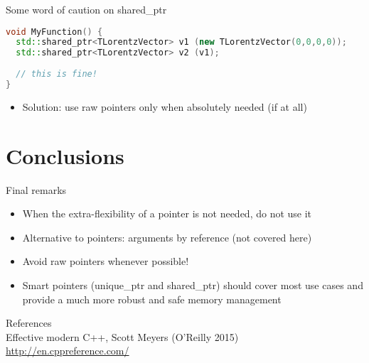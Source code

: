 \documentclass[xcolor={usenames,dvipsnames}]{beamer}
\begin{document}
\begin{frame}[fragile]{Some word of caution on shared\_ptr}
\scriptsize
\begin{lstlisting}[language=C++]
void MyFunction() {
  std::shared_ptr<TLorentzVector> v1 (new TLorentzVector(0,0,0,0));
  std::shared_ptr<TLorentzVector> v2 (v1);
  
  // this is fine!
}
\end{lstlisting}
\small
\begin{itemize}
\item Solution: use raw pointers only when absolutely needed (if at all)
\end{itemize}
\end{frame}

\section{Conclusions}

\begin{frame}[fragile]{Final remarks}
\begin{itemize}
\item When the extra-flexibility of a pointer is not needed, do not use it
\item Alternative to pointers: arguments by reference (not covered here)
\item Avoid raw pointers whenever possible!
\item Smart pointers (unique\_ptr and shared\_ptr) should cover most use cases and provide
a much more robust and safe memory management
\end{itemize}
References \\
Effective modern C++, Scott Meyers (O'Reilly 2015) \\
\href{http://en.cppreference.com/}{http://en.cppreference.com/}
\end{frame}
\end{document}
